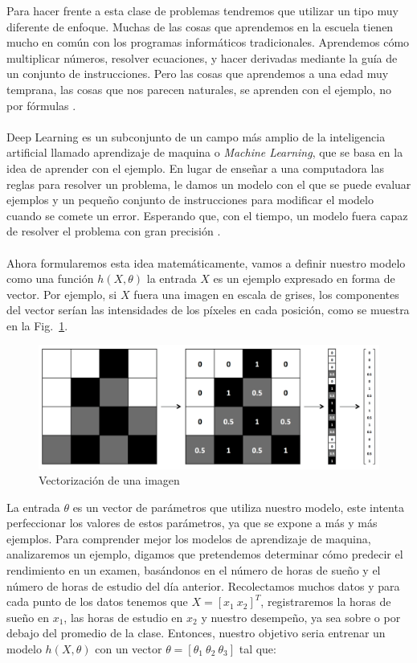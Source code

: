     Para hacer frente a esta clase de problemas tendremos que utilizar un tipo muy diferente de enfoque. Muchas de las cosas que aprendemos en la escuela tienen mucho en común con los programas informáticos tradicionales. Aprendemos cómo multiplicar números, resolver ecuaciones, y hacer derivadas mediante la guía de un conjunto de instrucciones. Pero las cosas que aprendemos a una edad muy temprana, las cosas que nos parecen naturales, se aprenden con el ejemplo, no por fórmulas \cite{dlBook}.
    \\\\
    Deep Learning es un subconjunto de un campo más amplio de la inteligencia artificial llamado aprendizaje de maquina o \textit{Machine Learning}, que se basa en la idea de aprender con el ejemplo. En lugar de enseñar a una computadora las reglas para resolver un problema, le damos un modelo con el que se puede evaluar ejemplos y un pequeño conjunto de instrucciones para modificar el modelo cuando se comete un error. Esperando que, con el tiempo, un modelo fuera capaz de resolver el problema con gran precisión \cite{dlBook}.
    \\\\
    Ahora formularemos esta idea matemáticamente, vamos a definir nuestro modelo como una función $h(X,\theta)$ la entrada $X$ es un ejemplo expresado en forma de vector. Por ejemplo, si $X$ fuera una imagen en escala de grises, los componentes del vector serían las intensidades de los píxeles en cada posición, como se muestra en la Fig.~\ref{fig:gscale}.
    \begin{figure}[htp]
        \centering
        \includegraphics[scale=0.3]{chapter3/grayscale.png}
        \caption{Vectorización de una imagen}
        \label{fig:gscale}
    \end{figure}

    La entrada $\theta$ es un vector de parámetros que utiliza nuestro modelo, este intenta perfeccionar los valores de estos parámetros, ya que se expone a más y más ejemplos. Para comprender mejor los modelos de aprendizaje de maquina, analizaremos un ejemplo, digamos que pretendemos determinar cómo predecir el rendimiento en un examen, basándonos en el número de horas de sueño y el número de horas de estudio del día anterior. Recolectamos muchos datos y para cada punto de los datos tenemos que $X=[x_1\ x_2]^T$, registraremos la horas de sueño en $x_1$, las horas de estudio en $x_2$ y nuestro desempeño, ya sea sobre o por debajo del promedio de la clase. Entonces, nuestro objetivo seria entrenar un modelo $h(X,\theta)$ con un vector $\theta=[\theta_1\ \theta_2\ \theta_3]$ tal que:

